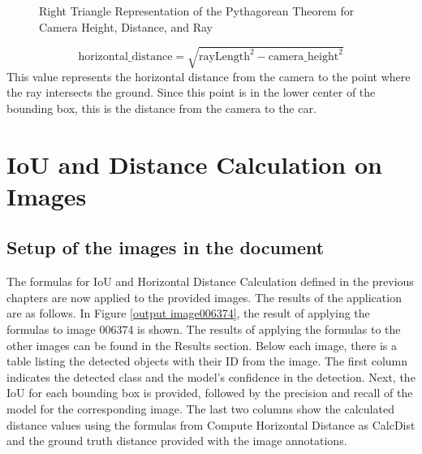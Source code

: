 \documentclass[a4paper,twocolumn]{article}
\begin{document}
\begin{figure}[h!]
    \centering
    \caption{Right Triangle Representation of the Pythagorean Theorem for Camera Height, Distance, and Ray}
\end{figure}

\[
\text{horizontal\_distance} = \sqrt{\text{rayLength}^2 - \text{camera\_height}^2}
\]
This value represents the horizontal distance from the camera to the point where the ray intersects the ground. Since this point is in the lower center of the bounding box, this is the distance from the camera to the car.
\newpage
\section{IoU and Distance Calculation on Images}
\subsection{Setup of the images in the document}
The formulas for IoU and Horizontal Distance Calculation defined in the previous chapters are now applied to the provided images. The results of the application are as follows. In Figure \ref{output image006374}, the result of applying the formulas to image 006374 is shown. The results of applying the formulas to the other images can be found in the Results section. Below each image, there is a table listing the detected objects with their ID from the image. The first column indicates the detected class and the model's confidence in the detection. Next, the IoU for each bounding box is provided, followed by the precision and recall of the model for the corresponding image. The last two columns show the calculated distance values using the formulas from Compute Horizontal Distance as CalcDist and the ground truth distance provided with the image annotations.
\end{document}
